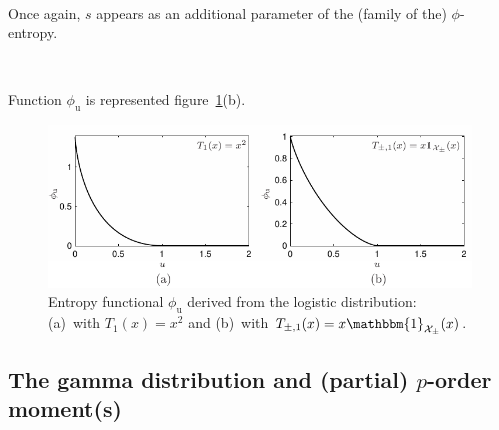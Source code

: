 \documentclass[entropy,article,submit,moreauthors,pdftex]{Definitions/mdpi}
\newcommand{\SZ}[1]{{\color{blue} #1}}                                       %
\def\X{\mathcal{X}}%
\def\un{\mathbbm{1}}%
\def\u{\mathrm{u}}
\begin{document}
{\

\SZ{Once again,  $s$ appears as an  additional parameter of the  (family of the)
  $\phi$-entropy.}

\

Function $\phi_\u$ is represented figure~\ref{fig:Entropy-logistic}(b).


\begin{figure}[htbp]
\centerline{\includegraphics[width=\columnwidth]{PDF/MaxEnt_LogisticLaw}}
\caption{Entropy  functional  $\phi_\u$   derived  from  the  logistic
  distribution:  (a)~with  $T_1(x)  =  x^2$   and  (b)~with  $T_{\pm,1}(x)  =  x
  \un_{\X_\pm}(x)$.}
\label{fig:Entropy-logistic}
\end{figure}
}


\subsection{The gamma distribution and (partial) $p$-order moment(s)}
\label{subsecapp:GammaFirstOrder}
\end{document}
